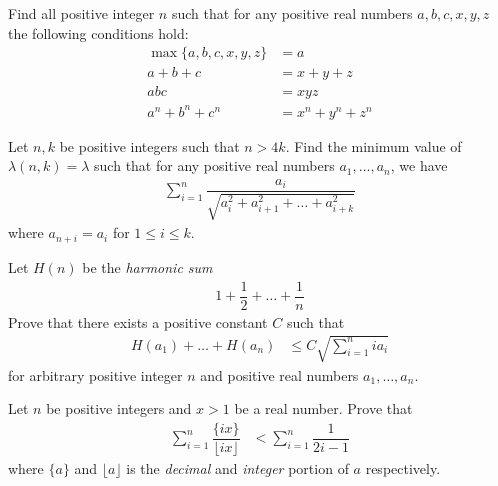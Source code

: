 \documentclass{subfile}
\begin{document}
		\begin{problem}
			Find all positive integer $n$ such that for any positive real numbers $a,b,c,x,y,z$ the following conditions hold:
				\begin{align*}
					\max\{a,b,c,x,y,z\}
						& = a\\
					a+b+c
						& = x+y+z\\
					abc
						& = xyz\\
					a^{n}+b^{n}+c^{n}
						& = x^{n}+y^{n}+z^{n}
				\end{align*}
		\end{problem}
	
		\begin{problem}
			Let $n,k$ be positive integers such that $n>4k$. Find the minimum value of $\lambda(n,k)=\lambda$ such that for any positive real numbers $a_{1},\ldots,a_{n}$, we have
				\begin{align*}
					\sum_{i=1}^{n}\dfrac{a_{i}}{\sqrt{a_{i}^{2}+a_{i+1}^{2}+\ldots+a_{i+k}^{2}}}
				\end{align*}
			where $a_{n+i}=a_i$ for $1\leq i\leq k$.
		\end{problem}
	
		\begin{problem}
			Let $H(n)$ be the \textit{harmonic sum}
				\begin{align*}
					1+\dfrac{1}{2}+\ldots+\dfrac{1}{n}
				\end{align*}
			Prove that there exists a positive constant $C$ such that
				\begin{align*}
					H(a_{1})+\ldots+H(a_{n})
						& \leq C\sqrt{\sum_{i=1}^{n}ia_{i}}
				\end{align*}
			for arbitrary positive integer $n$ and positive real numbers $a_{1},\ldots,a_{n}$.
		\end{problem}
	
		\begin{problem}
			Let $n$ be positive integers and $x>1$ be a real number. Prove that
				\begin{align*}
					\sum_{i=1}^{n}\dfrac{\{ix\}}{\lfloor ix\rfloor}
						& < \sum_{i=1}^{n}\dfrac{1}{2i-1}
				\end{align*}
			where $\{a\}$ and $\lfloor a\rfloor$ is the \textit{decimal} and \textit{integer} portion of $a$ respectively.
		\end{problem}
	
\end{document}
